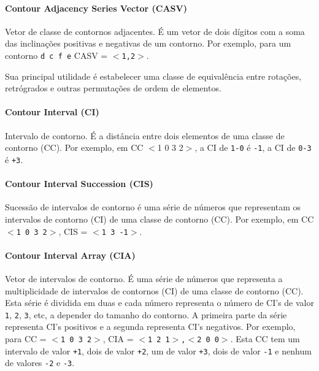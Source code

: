 \documentclass[12pt,brazil]{book}
\begin{document}
\paragraph{Contour Adjacency Series Vector (CASV)}
\label{sec:cont-adjac-seri-1}

Vetor de classe de contornos adjacentes. É um vetor de dois dígitos
com a soma das inclinações positivas e negativas de um contorno. Por
exemplo, para um contorno \texttt{d c f e} CASV = \texttt{$<$1,2$>$}.

Sua principal utilidade é estabelecer uma classe de equivalência entre
rotações, retrógrados e outras permutações de ordem de elementos.

\paragraph{Contour Interval (CI)}
\label{sec:contour-interval-ci}

Intervalo de contorno. É a distância entre dois elementos de uma
classe de contorno (CC). Por exemplo, em CC $<$1 0 3 2$>$, a CI de \texttt{1-0} é
\texttt{-1}, a CI de \texttt{0-3} é \texttt{+3}.

\paragraph{Contour Interval Succession (CIS)}
\label{sec:cont-interv-succ}

Sucessão de intervalos de contorno é uma série de números que
representam os intervalos de contorno (CI) de uma classe de contorno
(CC). Por exemplo, em CC \texttt{$<$1 0 3 2$>$}, CIS = \texttt{$<$1 3 -1$>$}.

\paragraph{Contour Interval Array (CIA)}
\label{sec:cont-interv-array}

Vetor de intervalos de contorno. É uma série de números que representa
a multiplicidade de intervalos de contornos (CI) de uma classe de
contorno (CC). Esta série é dividida em duas e cada número representa
o número de CI's de valor \texttt{1}, \texttt{2}, \texttt{3}, etc, a
depender do tamanho do contorno. A primeira parte da série representa
CI's positivos e a segunda representa CI's negativos. Por exemplo,
para CC = \texttt{$<$1 0 3 2$>$}, CIA = \texttt{$<$1 2 1$>$,$<$2 0
  0$>$}. Esta CC tem um intervalo de valor \texttt{+1}, dois de valor
\texttt{+2}, um de valor \texttt{+3}, dois de valor \texttt{-1} e
nenhum de valores \texttt{-2} e \texttt{-3}.
\end{document}
